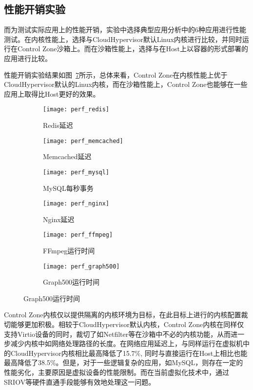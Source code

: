 \subsection{性能开销实验}

而为测试实际应用上的性能开销，实验中选择典型应用分析中的6种应用进行性能测试。在内核性能上，选择与CloudHypervisor默认Linux内核进行比较，并同时运行在Control Zone沙箱上。而在沙箱性能上，选择与在Host上以容器的形式部署的应用进行比较。

性能开销实验结果如图~\ref{fig:perf_app}所示，总体来看，Control Zone在内核性能上优于CloudHypervisor默认的Linux内核，而在沙箱性能上，Control Zone也能够在一些应用上取得比Host更好的效果。

\begin{figure}[!htbp]
    \centering
    \begin{subfigure}[b]{0.32\textwidth}
        \texttt{[image: perf\_redis]}
        \caption{\quad Redis延迟}
        \label{fig:perf_redis}
    \end{subfigure}
    \begin{subfigure}[b]{0.32\textwidth}
        \texttt{[image: perf\_memcached]}
        \caption{\quad Memcached延迟}
        \label{fig:perf_memcached}
    \end{subfigure}
    \begin{subfigure}[b]{0.32\textwidth}
        \texttt{[image: perf\_mysql]}
        \caption{\quad MySQL每秒事务}
        \label{fig:perf_mysql}
    \end{subfigure}
    \begin{subfigure}[b]{0.32\textwidth}
        \texttt{[image: perf\_nginx]}
        \caption{\quad Nginx延迟}
        \label{fig:perf_nginx}
    \end{subfigure}
    \begin{subfigure}[b]{0.32\textwidth}
        \texttt{[image: perf\_ffmpeg]}
        \caption{\quad FFmpeg运行时间}
        \label{fig:perf_ffmpeg}
    \end{subfigure}
    \begin{subfigure}[b]{0.32\textwidth}
        \texttt{[image: perf\_graph500]}
        \caption{\quad Graph500运行时间}
        \label{fig:perf_graph500}
    \end{subfigure}
\label{fig:perf_app}
\end{figure}

Control Zone内核仅以提供隔离的内核环境为目标，在此目标上进行的内核配置裁切能够更加积极。相较于CloudHypervisor默认内核，Control Zone内核在同样仅支持Virtio设备的同时，裁切了如Netfilter等在沙箱中不必的内核功能，从而进一步减少内核中如网络处理路径的长度。在网络应用延迟上，与同样运行在虚拟机中的CloudHypervisor内核相比最高降低了15.7\%, 同时与直接运行在Host上相比也能最高降低了38.5\%。但是，对于一些逻辑复杂的应用，如MySQL，则存在一定的性能劣化，主要原因是虚拟设备的性能限制。而在当前虚拟化技术中，通过SRIOV等硬件直通手段能够有效地处理这一问题。

